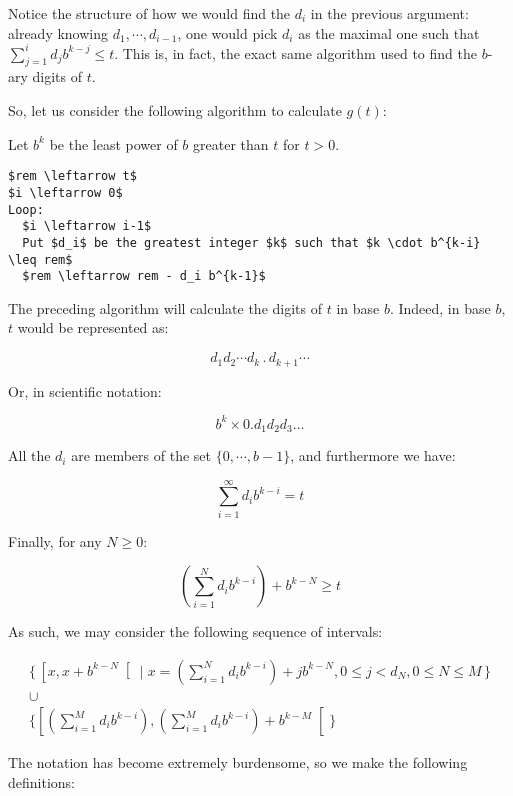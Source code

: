 \documentclass[11pt, reqno]{amsart}
\begin{document}
\bigskip

Notice the structure of how we would find the $d_i$ in the previous argument: already knowing $d_1, \cdots, d_{i-1}$, one would pick $d_i$ as the maximal one such that $\sum_{j = 1}^i d_j b^{k-j} \leq t$. This is, in fact, the exact same algorithm used to find the $b$-ary digits of $t$.

So, let us consider the following algorithm to calculate $g(t)$:

Let $b^k$ be the least power of $b$ greater than $t$ for $t > 0$.

\begin{lstlisting}
$rem \leftarrow t$
$i \leftarrow 0$
Loop:
  $i \leftarrow i-1$
  Put $d_i$ be the greatest integer $k$ such that $k \cdot b^{k-i} \leq rem$
  $rem \leftarrow rem - d_i b^{k-1}$
\end{lstlisting}
\label{digalg}

The preceding algorithm will calculate the digits of $t$ in base $b$. Indeed, in base $b$, $t$ would be represented as:

\[d_1 d_2 \cdots d_k \, . \, d_{k+1} \cdots\]

Or, in scientific notation:

\[b^k \times 0.d_1 d_2 d_3 \dots\]

All the $d_i$ are members of the set $\{ 0, \cdots, b-1\}$, and furthermore we have:

\[\sum_{i = 1}^\infty d_i b^{k-i} = t\]

Finally, for any $N \geq 0$:

\[(\sum_{i=1}^N d_i b^{k-i}) + b^{k-N} \geq t\]

As such, we may consider the following sequence of intervals:

\begin{gather*}
\{\, \left[ x , x + b^{k-N} \right[ \mid x = (\sum_{i=1}^N d_i b^{k-i}) + j b^{k-N}, 0 \leq j < d_N, 0 \leq N \leq M\,\}\\
\cup\\
\{\left[ (\sum_{i=1}^M d_i b^{k-i}) ,(\sum_{i=1}^M d_i b^{k-i}) + b^{k-M} \right[\}
\end{gather*}

The notation has become extremely burdensome, so we make the following definitions:
\end{document}
